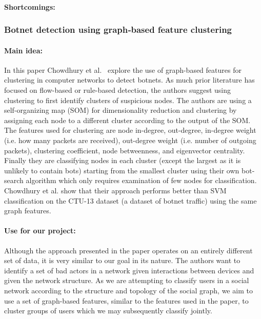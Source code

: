 \paragraph{Shortcomings:}

\subsubsection{Botnet detection using graph‐based feature clustering}

\paragraph{Main idea:}
In this paper Chowdhury et al.~\cite{chowdhury2017botnet} explore the use of graph-based features for clustering in computer networks to detect botnets. As much prior literature has focused on flow-based or rule-based detection, the authors suggest using clustering to first identify clusters of suspicious nodes. The authors are using a self-organizing map (SOM) for dimensionality reduction and clustering by assigning each node to a different cluster according to the output of the SOM. The features used for clustering are node in-degree, out-degree, in-degree weight (i.e. how many packets are received), out-degree weight (i.e. number of outgoing packets), clustering coefficient, node betweenness, and eigenvector centrality. Finally they are classifying nodes in each cluster (except the largest as it is unlikely to contain bots) starting from the smallest cluster using their own bot-search algorithm which only requires examination of few nodes for classification.
Chowdhury et al. show that their approach performs better than SVM classification on the CTU-13 dataset (a dataset of botnet traffic) using the same graph features.

\paragraph{Use for our project:}
Although the approach presented in the paper operates on an entirely different set of data, it is very similar to our goal in its nature. The authors want to identify a set of bad actors in a network given interactions between devices and given the network structure. As we are attempting to classify users in a social network according to the structure and topology of the social graph, we aim to use a set of graph-based features, similar to the features used in the paper, to cluster groups of users which we may subsequently classify jointly.

